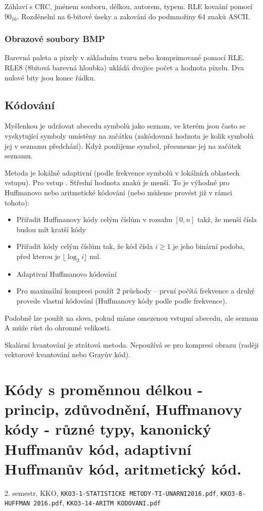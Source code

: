 \documentclass[a4paper, 11pt]{report}
\begin{document}
Záhlaví s CRC, jménem souboru, délkou, autorem, typem. RLE kovaání pomocí $90_{16}$. Rozděnelní na 6-bitové úseky a zakování do podmnožiny 64 znaků ASCII.

\subsection{Obrazové soubory BMP}
Barevná paleta a pixely v základním tvaru nebo komprimované pomocí RLE. RLE8 (8bitová barevná hloubka) ukládá dvojice počet a hodnota pixelu. Dva nulové bity jsou konec řádku.

\section{Kódování }
Myšlenkou je udržovat abecedu symbolů jako seznam, ve kterém jsou často se vyskytující symboly umístěny na začátku (zakódovaná hodnota je kolik symbolů jej v seznamu předchází). Když použijeme symbol, přesuneme jej na začátek seznamu.

Metoda je lokálně adaptivní (podle frekvence symbolů v lokálních oblastech vstupu). Pro vstup . Střední hodnota znaků je menší. To je výhodné pro Huffmanovo nebo aritmetické kódování (nebo můžeme provést již v rámci tohoto):
\begin{itemize}
	\item Přiřadit Huffmanovy kódy celým číslům v rozsahu $[0, n]$ takž, že menší čísla budou mít kratší kódy
	\item Přiřadit kódy celým číslům tak, že kód čísla $i \geq 1$ je jeho binární podoba, před kterou je $\lfloor \log_2 i \rfloor$ nul.
	\item Adaptivní Huffmanovo kódování
	\item Pro maximální kompresi použít 2 průchody -- první počítá frekvence a druhý provede vlastní kódování (Huffmanovy kódy podle podle frekvence).
\end{itemize}

Podobně lze použít na slova, pokud máme omezenou vstupní abecedu, ale seznam A může růst do ohromné velikosti.

Skalární kvantování je ztrátová metoda. Nepoužívá se pro kompresi obrazu (raději vektorové kvantování nebo Grayův kód).


\chapter{Kódy s proměnnou délkou - princip, zdůvodnění, Huffmanovy kódy - různé typy, kanonický Huffmanův kód, adaptivní Huffmanův kód, aritmetický kód.} \label{cha:35}
2. semestr, KKO, \texttt{KKO3-1-STATISTICKE METODY-TI-UNARNI2016.pdf}, \texttt{KKO3-8-HUFFMAN 2016.pdf}, \texttt{KKO3-14-ARITM KODOVANI.pdf}
\end{document}

